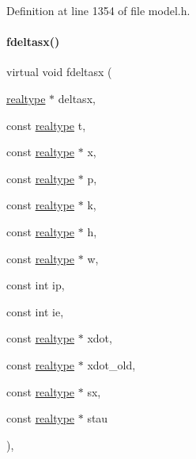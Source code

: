 Definition at line 1354 of file model.\+h.

\mbox{\label{classamici_1_1_model_ac28a487f8f0a893e03271a29098c264f}} 
\paragraph{\texorpdfstring{fdeltasx()}{fdeltasx()}\hspace{0.1cm}{\footnotesize\ttfamily [2/2]}}
{\footnotesize\ttfamily virtual void fdeltasx (\begin{DoxyParamCaption}\item[{\mbox{\hyperlink{namespaceamici_a1bdce28051d6a53868f7ccbf5f2c14a3}{realtype}} $\ast$}]{deltasx,  }\item[{const \mbox{\hyperlink{namespaceamici_a1bdce28051d6a53868f7ccbf5f2c14a3}{realtype}}}]{t,  }\item[{const \mbox{\hyperlink{namespaceamici_a1bdce28051d6a53868f7ccbf5f2c14a3}{realtype}} $\ast$}]{x,  }\item[{const \mbox{\hyperlink{namespaceamici_a1bdce28051d6a53868f7ccbf5f2c14a3}{realtype}} $\ast$}]{p,  }\item[{const \mbox{\hyperlink{namespaceamici_a1bdce28051d6a53868f7ccbf5f2c14a3}{realtype}} $\ast$}]{k,  }\item[{const \mbox{\hyperlink{namespaceamici_a1bdce28051d6a53868f7ccbf5f2c14a3}{realtype}} $\ast$}]{h,  }\item[{const \mbox{\hyperlink{namespaceamici_a1bdce28051d6a53868f7ccbf5f2c14a3}{realtype}} $\ast$}]{w,  }\item[{const int}]{ip,  }\item[{const int}]{ie,  }\item[{const \mbox{\hyperlink{namespaceamici_a1bdce28051d6a53868f7ccbf5f2c14a3}{realtype}} $\ast$}]{xdot,  }\item[{const \mbox{\hyperlink{namespaceamici_a1bdce28051d6a53868f7ccbf5f2c14a3}{realtype}} $\ast$}]{xdot\+\_\+old,  }\item[{const \mbox{\hyperlink{namespaceamici_a1bdce28051d6a53868f7ccbf5f2c14a3}{realtype}} $\ast$}]{sx,  }\item[{const \mbox{\hyperlink{namespaceamici_a1bdce28051d6a53868f7ccbf5f2c14a3}{realtype}} $\ast$}]{stau }\end{DoxyParamCaption})\hspace{0.3cm}{\ttfamily [protected]}, {\ttfamily [virtual]}}

